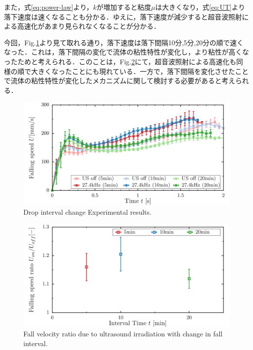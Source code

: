 また，式\ref{eq:power-law}より，$k$が増加すると粘度$\mu$は大きくなり，式\ref{eq:UT}より落下速度は速くなることも分かる．ゆえに，落下速度が減少すると超音波照射による高速化があまり見られなくなることが分かる．

今回，Fig.\ref{fig:interval-change}より見て取れる通り，落下速度は落下間隔10分,5分,20分の順で速くなった．これは，落下間隔の変化で流体の粘性特性が変化し，より粘性が高くなったためと考えられる．このことは，Fig.\ref{fig:speed-diff}にて，超音波照射による高速化も同様の順で大きくなったことにも現れている．一方で，落下間隔を変化させたことで流体の粘性特性が変化したメカニズムに関して検討する必要があると考えられる．

\begin{figure}[ht]
    \begin{center}
        \includegraphics[width=13cm,clip]{5-Discussion/interval.png} 
        \caption{Drop interval change Experimental results.}
        \label{fig:interval-change}
    \end{center}
\end{figure}

\begin{figure}[ht]
    \begin{center}
        \includegraphics[width=13cm,clip]{5-Discussion/diff.png}
        \caption{Fall velocity ratio due to ultrasound irradiation with change in fall interval.}
        \label{fig:speed-diff}
    \end{center}
\end{figure}